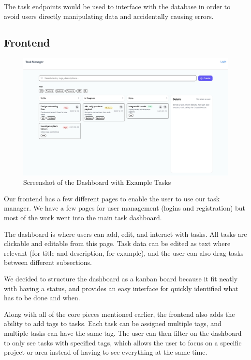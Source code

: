 \documentclass[11pt,oneside]{article}
\begin{document}
The task endpoints would be used to interface with the database in order to avoid users directly manipulating data and accidentally causing errors.

\subsection{Frontend}

\begin{figure}[H]
    \centering
    \includegraphics[width=1.0\textwidth]{dashboard_screenshot.jpeg}
    \caption{Screenshot of the Dashboard with Example Tasks}
    \label{fig:dashboard-screenshot}
\end{figure}

Our frontend has a few different pages to enable the user to use our task manager. We have a few pages for user management (logins and registration) but most of the work went into the main task dashboard.

The dashboard is where users can add, edit, and interact with tasks. All tasks are clickable and editable from this page. Task data can be edited as text where relevant (for title and description, for example), and the user can also drag tasks between different subsections.

We decided to structure the dashboard as a kanban board because it fit neatly with having a status, and provides an easy interface for quickly identified what has to be done and when.

Along with all of the core pieces mentioned earlier, the frontend also adds the ability to add tags to tasks. Each task can be assigned multiple tags, and multiple tasks can have the same tag. The user can then filter on the dashboard to only see tasks with specified tags, which allows the user to focus on a specific project or area instead of having to see everything at the same time.
\end{document}
